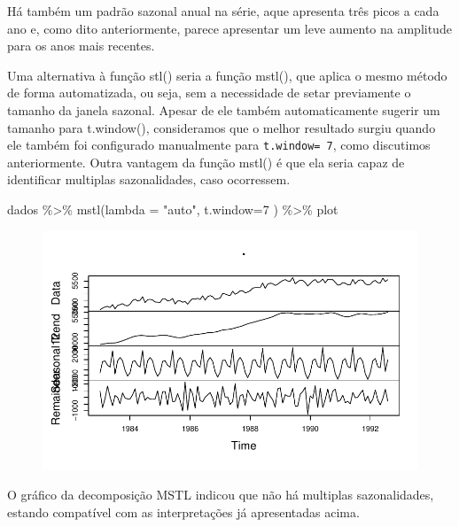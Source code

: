 \documentclass[
  letterpaper,
  DIV=11,
  numbers=noendperiod]{scrartcl}
\newenvironment{Shaded}{\begin{snugshade}}{\end{snugshade}}
\newcommand{\AttributeTok}[1]{\textcolor[rgb]{0.40,0.45,0.13}{#1}}
\newcommand{\DecValTok}[1]{\textcolor[rgb]{0.68,0.00,0.00}{#1}}
\newcommand{\FunctionTok}[1]{\textcolor[rgb]{0.28,0.35,0.67}{#1}}
\newcommand{\NormalTok}[1]{\textcolor[rgb]{0.00,0.23,0.31}{#1}}
\newcommand{\SpecialCharTok}[1]{\textcolor[rgb]{0.37,0.37,0.37}{#1}}
\newcommand{\StringTok}[1]{\textcolor[rgb]{0.13,0.47,0.30}{#1}}
\begin{document}
Há também um padrão sazonal anual na série, aque apresenta três picos a
cada ano e, como dito anteriormente, parece apresentar um leve aumento
na amplitude para os anos mais recentes.

Uma alternativa à função stl() seria a função mstl(), que aplica o mesmo
método de forma automatizada, ou seja, sem a necessidade de setar
previamente o tamanho da janela sazonal. Apesar de ele também
automaticamente sugerir um tamanho para t.window(), consideramos que o
melhor resultado surgiu quando ele também foi configurado manualmente
para \texttt{t.window=\ 7}, como discutimos anteriormente. Outra
vantagem da função mstl() é que ela seria capaz de identificar multiplas
sazonalidades, caso ocorressem.

\begin{Shaded}
\begin{Highlighting}[]
\NormalTok{dados }\SpecialCharTok{\%\textgreater{}\%} \FunctionTok{mstl}\NormalTok{(}\AttributeTok{lambda =} \StringTok{"auto"}\NormalTok{, }\AttributeTok{t.window=}\DecValTok{7}\NormalTok{ ) }\SpecialCharTok{\%\textgreater{}\%}\NormalTok{ plot}
\end{Highlighting}
\end{Shaded}

\begin{figure}[H]

{\centering \includegraphics{Trabalhao1_ST_grupo5_2023_05_16_files/figure-pdf/unnamed-chunk-5-1.pdf}

}

\end{figure}

O gráfico da decomposição MSTL indicou que não há multiplas
sazonalidades, estando compatível com as interpretações já apresentadas
acima.
\end{document}
